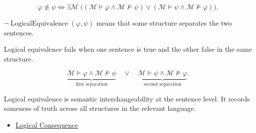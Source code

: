\begin{remark*}
\[
\varphi\not\equiv\psi
\Longleftrightarrow
\exists \mathcal M\;\bigl((\mathcal M\models\varphi \land \mathcal M\not\models\psi)
\lor
(\mathcal M\models\psi \land \mathcal M\not\models\varphi)\bigr).
\]
\end{remark*}

\begin{remark*}
\(\neg\operatorname{LogicalEquivalence}(\varphi,\psi)\) means that some
structure separates the two sentences.
\end{remark*}

\begin{remark*}
Logical equivalence fails when one sentence is true and the other false in the
same structure.
\end{remark*}

\begin{remark*}
\[
\underbrace{\mathcal M\models\varphi \land \mathcal M\not\models\psi}_{\text{first separation}}
\quad\lor\quad
\underbrace{\mathcal M\models\psi \land \mathcal M\not\models\varphi}_{\text{second separation}}.
\]
\end{remark*}

\begin{remark*}[Interpretation]
Logical equivalence is semantic interchangeability at the sentence level. It
records sameness of truth across all structures in the relevant language.
\end{remark*}

\begin{dependencies}
\begin{itemize}
  \item \hyperref[def:log-consequence]{Logical Consequence}
\end{itemize}
\end{dependencies}
